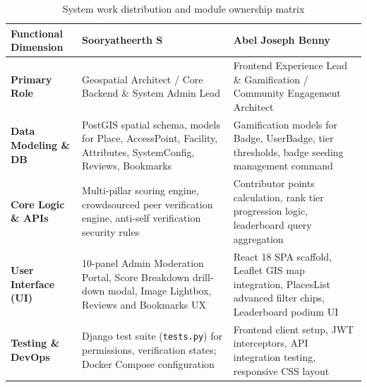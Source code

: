 \documentclass[12pt,a4paper]{report}
\begin{document}
\begin{table}[htbp]
\centering
\caption{System work distribution and module ownership matrix}
\label{tab:work_breakdown}
\small
\begin{tabularx}{\textwidth}{lXX}
\toprule
\textbf{Functional Dimension} & \textbf{Sooryatheerth S} & \textbf{Abel Joseph Benny} \\
\midrule
\textbf{Primary Role} & Geospatial Architect / Core Backend \& System Admin Lead & Frontend Experience Lead \& Gamification / Community Engagement Architect \\
\addlinespace
\textbf{Data Modeling \& DB} & PostGIS spatial schema, models for Place, AccessPoint, Facility, Attributes, SystemConfig, Reviews, Bookmarks & Gamification models for Badge, UserBadge, tier thresholds, badge seeding management command \\
\addlinespace
\textbf{Core Logic \& APIs} & Multi-pillar scoring engine, crowdsourced peer verification engine, anti-self verification security rules & Contributor points calculation, rank tier progression logic, leaderboard query aggregation \\
\addlinespace
\textbf{User Interface (UI)} & 10-panel Admin Moderation Portal, Score Breakdown drill-down modal, Image Lightbox, Reviews and Bookmarks UX & React 18 SPA scaffold, Leaflet GIS map integration, PlacesList advanced filter chips, Leaderboard podium UI \\
\addlinespace
\textbf{Testing \& DevOps} & Django test suite (\texttt{tests.py}) for permissions, verification states; Docker Compose configuration & Frontend client setup, JWT interceptors, API integration testing, responsive CSS layout \\
\bottomrule
\end{tabularx}
\end{table}
\end{document}

